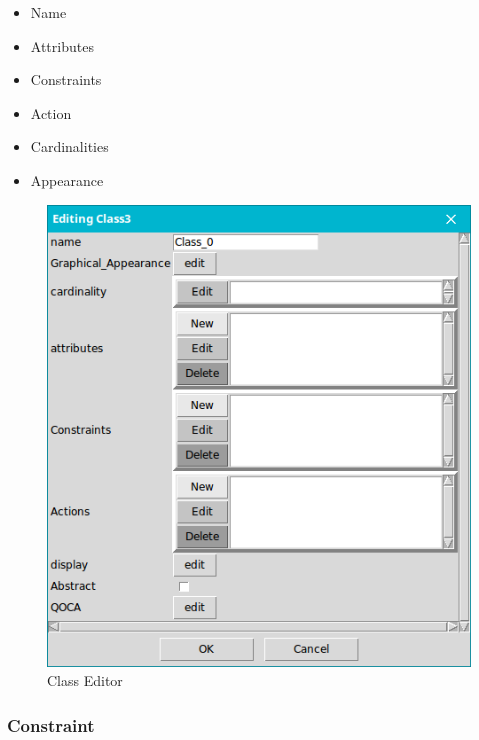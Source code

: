 \begin{minipage}{0.5\textwidth}
\begin{itemize}
\newcommand{\localtextbulletone}{\textcolor{gray}{\raisebox{.45ex}{\rule{.6ex}{.6ex}}}}
\renewcommand{\labelitemi}{\localtextbulletone}
\item  Name
\item  Attributes
\item  Constraints
\item  Action
\item  Cardinalities
\item  Appearance
\end{itemize}
\end{minipage} \hfill
\begin{minipage}{0.45\textwidth}
\begin{figure}[H]
\centering
		\includegraphics[scale=0.4]{ch3/img/class}
	\caption{\label{fig:Class Editor}Class Editor}
\end{figure}
\end{minipage}

\vspace{1cm}

\subsubsection{Constraint}

